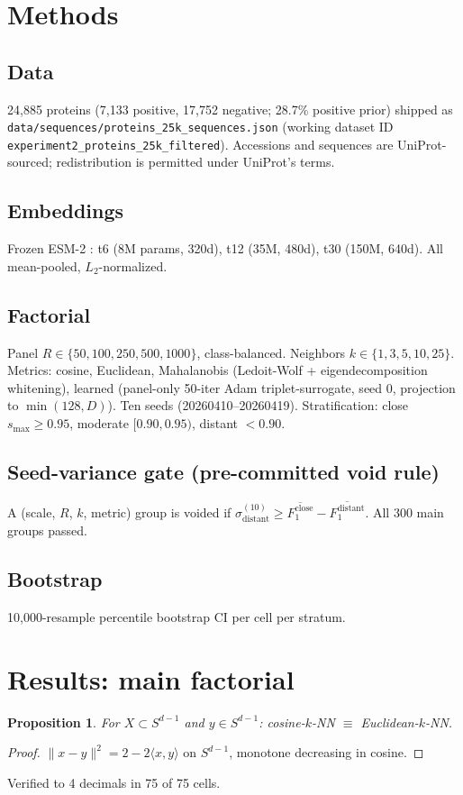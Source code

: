 \documentclass[11pt]{article}
\newtheorem{proposition}{Proposition}
\begin{document}
\section{Methods}
\subsection{Data} 24{,}885 proteins (7{,}133 positive, 17{,}752 negative; 28.7\% positive prior) shipped as \texttt{data/sequences/proteins\_25k\_sequences.json} (working dataset ID \texttt{experiment2\_proteins\_25k\_filtered}). Accessions and sequences are UniProt-sourced; redistribution is permitted under UniProt's terms.

\subsection{Embeddings} Frozen ESM-2 \cite{lin2023evolutionary}: t6 (8M params, 320d), t12 (35M, 480d), t30 (150M, 640d). All mean-pooled, $L_2$-normalized.

\subsection{Factorial} Panel $R \in \{50,100,250,500,1000\}$, class-balanced. Neighbors $k \in \{1,3,5,10,25\}$. Metrics: cosine, Euclidean, Mahalanobis (Ledoit-Wolf \cite{ledoit2004} + eigendecomposition whitening), learned (panel-only 50-iter Adam triplet-surrogate, seed 0, projection to $\min(128, D)$). Ten seeds (20260410--20260419). Stratification: close $s_{\max}\ge 0.95$, moderate $[0.90, 0.95)$, distant $< 0.90$.

\subsection{Seed-variance gate (pre-committed void rule)} A (scale, $R$, $k$, metric) group is voided if $\sigma^{(10)}_{\text{distant}} \ge \overline{F_1^{\text{close}}} - \overline{F_1^{\text{distant}}}$. All 300 main groups passed.

\subsection{Bootstrap} 10{,}000-resample percentile bootstrap CI per cell per stratum.

\section{Results: main factorial}
\begin{proposition}
For $X \subset S^{d-1}$ and $y \in S^{d-1}$: cosine-$k$-NN $\equiv$ Euclidean-$k$-NN.
\end{proposition}
\begin{proof}
$\|x-y\|^2 = 2 - 2\langle x, y \rangle$ on $S^{d-1}$, monotone decreasing in cosine.
\end{proof}
Verified to 4 decimals in 75 of 75 cells.
\end{document}
